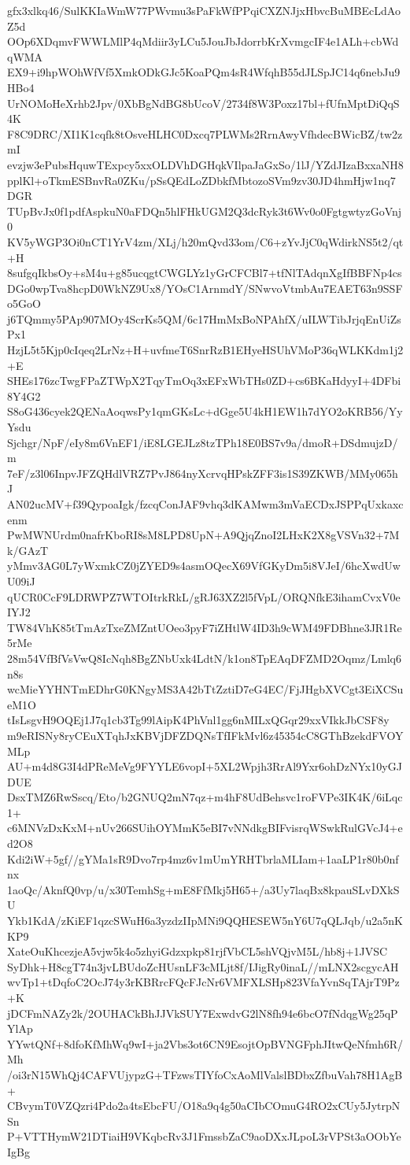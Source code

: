 gfx3xlkq46/SulKKIaWmW77PWvmu3sPaFkWfPPqiCXZNJjxHbvcBuMBEcLdAoZ5d
OOp6XDqmvFWWLMlP4qMdiir3yLCu5JouJbJdorrbKrXvmgcIF4e1ALh+cbWdqWMA
EX9+i9hpWOhWfVf5XmkODkGJc5KoaPQm4sR4WfqhB55dJLSpJC14q6nebJu9HBo4
UrNOMoHeXrhb2Jpv/0XbBgNdBG8bUcoV/2734f8W3Poxz17bl+fUfnMptDiQqS4K
F8C9DRC/XI1K1cqfk8tOsveHLHC0Dxcq7PLWMs2RrnAwyVfhdecBWicBZ/tw2zmI
evzjw3ePubsHquwTExpcy5xxOLDVhDGHqkVIlpaJaGxSo/1lJ/YZdJIzaBxxaNH8
pplKl+oTkmESBnvRa0ZKu/pSsQEdLoZDbkfMbtozoSVm9zv30JD4hmHjw1nq7DGR
TUpBvJx0f1pdfAspkuN0aFDQn5hlFHkUGM2Q3dcRyk3t6Wv0o0FgtgwtyzGoVnj0
KV5yWGP3Oi0nCT1YrV4zm/XLj/h20mQvd33om/C6+zYvJjC0qWdirkNS5t2/qt+H
8sufgqIkbsOy+sM4u+g85ucqgtCWGLYz1yGrCFCBl7+tfNlTAdqnXgIfBBFNp4cs
DGo0wpTva8hcpD0WkNZ9Ux8/YOsC1ArnmdY/SNwvoVtmbAu7EAET63n9SSFo5GoO
j6TQmmy5PAp907MOy4ScrKs5QM/6c17HmMxBoNPAhfX/uILWTibJrjqEnUiZsPx1
HzjL5t5Kjp0cIqeq2LrNz+H+uvfmeT6SnrRzB1EHyeHSUhVMoP36qWLKKdm1j2+E
SHEs176zcTwgFPaZTWpX2TqyTmOq3xEFxWbTHs0ZD+cs6BKaHdyyI+4DFbi8Y4G2
S8oG436cyek2QENaAoqwsPy1qmGKsLc+dGge5U4kH1EW1h7dYO2oKRB56/YyYsdu
Sjchgr/NpF/eIy8m6VnEF1/iE8LGEJLz8tzTPh18E0BS7v9a/dmoR+DSdmujzD/m
7eF/z3l06InpvJFZQHdlVRZ7PvJ864nyXcrvqHPskZFF3is1S39ZKWB/MMy065hJ
AN02ucMV+f39QypoaIgk/fzcqConJAF9vhq3dKAMwm3mVaECDxJSPPqUxkaxcenm
PwMWNUrdm0nafrKboRI8sM8LPD8UpN+A9QjqZnoI2LHxK2X8gVSVn32+7Mk/GAzT
yMmv3AG0L7yWxmkCZ0jZYED9s4asmOQecX69VfGKyDm5i8VJeI/6hcXwdUwU09iJ
qUCR0CcF9LDRWPZ7WTOItrkRkL/gRJ63XZ2l5fVpL/ORQNfkE3ihamCvxV0eIYJ2
TW84VhK85tTmAzTxeZMZntUOeo3pyF7iZHtlW4ID3h9cWM49FDBhne3JR1Re5rMe
28m54VfBfVsVwQ8IcNqh8BgZNbUxk4LdtN/k1on8TpEAqDFZMD2Oqmz/Lmlq6n8s
wcMieYYHNTmEDhrG0KNgyMS3A42bTtZztiD7eG4EC/FjJHgbXVCgt3EiXCSueM1O
tIsLsgvH9OQEj1J7q1cb3Tg99lAipK4PhVnl1gg6nMILxQGqr29xxVIkkJbCSF8y
m9eRISNy8ryCEuXTqhJxKBVjDFZDQNsTfIFkMvl6z45354cC8GThBzekdFVOYMLp
AU+m4d8G3I4dPReMeVg9FYYLE6vopI+5XL2Wpjh3RrAl9Yxr6ohDzNYx10yGJDUE
DsxTMZ6RwSscq/Eto/b2GNUQ2mN7qz+m4hF8UdBehsvc1roFVPe3IK4K/6iLqc1+
c6MNVzDxKxM+nUv266SUihOYMmK5eBI7vNNdkgBIFvisrqWSwkRulGVcJ4+ed2O8
Kdi2iW+5gf//gYMa1sR9Dvo7rp4mz6v1mUmYRHTbrlaMLIam+1aaLP1r80b0nfnx
1aoQc/AknfQ0vp/u/x30TemhSg+mE8FfMkj5H65+/a3Uy7laqBx8kpauSLvDXkSU
Ykb1KdA/zKiEF1qzcSWuH6a3yzdzIIpMNi9QQHESEW5nY6U7qQLJqb/u2a5nKKP9
XateOuKhcezjeA5vjw5k4o5zhyiGdzxpkp81rjfVbCL5shVQjvM5L/hb8j+1JVSC
SyDhk+H8cgT74n3jvLBUdoZcHUsnLF3cMLjt8f/IJigRy0inaL//mLNX2scgycAH
wvTp1+tDqfoC2OcJ74y3rKBRrcFQcFJcNr6VMFXLSHp823VfaYvnSqTAjrT9Pz+K
jDCFmNAZy2k/2OUHACkBhJJVkSUY7ExwdvG2lN8fh94e6bcO7fNdqgWg25qPYlAp
YYwtQNf+8dfoKfMhWq9wI+ja2Vbs3ot6CN9EsojtOpBVNGFphJItwQeNfmh6R/Mh
/oi3rN15WhQj4CAFVUjypzG+TFzwsTIYfoCxAoMlValslBDbxZfbuVah78H1AgB+
CBvymT0VZQzri4Pdo2a4tsEbcFU/O18a9q4g50aCIbCOmuG4RO2xCUy5JytrpNSn
P+VTTHymW21DTiaiH9VKqbcRv3J1FmssbZaC9aoDXxJLpoL3rVPSt3aOObYeIgBg
